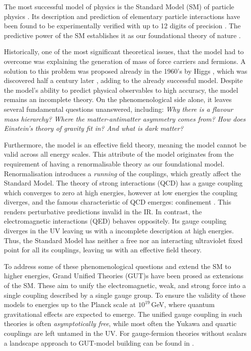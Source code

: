 The most successful model of physics is the Standard Model (SM) of particle physics \cite{Glashow:1961tr, Weinberg:1967tq}. Its description and prediction of elementary particle interactions have been found to be experimentally verified with up to 12 digits of precision \cite{Fan:2022eto}. The predictive power of the SM establishes it as our foundational theory of nature \cite{SLAC-SP-017:1974ind,E598:1974sol,PLUTO:1978jrw, CDF:1995wbb, D0:1995jca,UA1:1983mne, UA1:1983crd, UA2:1983mlz, UA2:1983tsx}. 

Historically, one of the most significant theoretical issues, that the model had to overcome was explaining the generation of mass of force carriers and fermions. A solution to this problem was proposed already in the 1960's by Higgs \cite{Higgs:1964ia, Higgs:1966ev}, which was discovered half a century later \cite{ATLAS:2012yve}, adding to the already successful model. Despite the model's ability to predict physical observables to high accuracy, the model remains an incomplete theory. On the phenomenological side alone, it leaves several fundamental questions unanswered, including: \textit{Why there is a flavour mass hierarchy? Where the matter-antimatter asymmetry comes from? How does Einstein's theory of gravity fit in? And what is dark matter?} 

Furthermore, the model is an effective field theory, meaning the model cannot be valid across all energy scales. This attribute of the model originates from the requirement of having a renormalisable theory as our foundational model. Renormalisation introduces a \textit{running} of the couplings, which greatly affect the Standard Model. The theory of strong interactions (QCD) has a gauge coupling which converges to zero at high energies, however at low energies the coupling diverges, and the famous characteristic of QCD emerges: confinement \cite{Gross:1973id}. This renders perturbative predictions invalid in the IR. In contrast, the electromagnetic interactions (QED) behaves oppositely. Its gauge coupling diverges in the UV leaving us with a incomplete description at high energies. Thus, the Standard Model has neither a free nor an interacting ultraviolet fixed point for all its couplings, leaving us with an effective field theory. 

To address some of these phenomenological questions and extend the SM to higher energies, Grand Unified Theories (GUT)s \cite{Georgi:1974yf, Fritzsch:1974nn, Pati:1974yy, Bai:2021tgl, Langacker:1980js} have been prosed as extensions of the SM. These aim to unify the electromagnetic, weak, and strong force into a single coupling described by a single gauge group. To ensure the validity of these models to energies up to the Planck scale at $10^{19}\,$GeV, where quantum gravitational effects are expected to emerge. The unified gauge coupling in such theories is often \textit{asymptotically free}, while most often the Yukawa and quartic couplings are left untamed in the UV. For gauge-fermion theories without scalars a landscape approach to GUT-model building can be found in \cite{Cacciapaglia:2025nff}.

